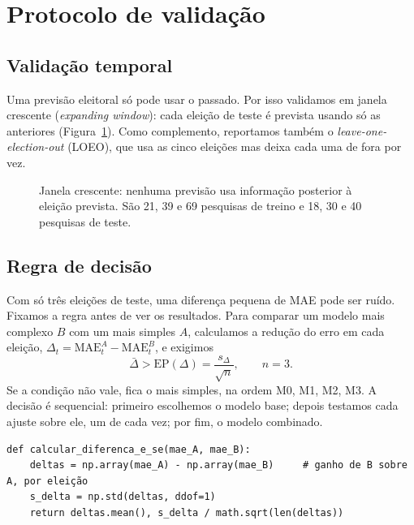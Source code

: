 \documentclass[10.5pt,a4paper]{article}
\begin{document}
\section{Protocolo de validação}

\subsection{Validação temporal}
Uma previsão eleitoral só pode usar o passado. Por isso validamos em janela crescente (\emph{expanding window}): cada eleição de teste é prevista usando só as anteriores (Figura~\ref{fig:ew}). Como complemento, reportamos também o \emph{leave-one-election-out} (LOEO), que usa as cinco eleições mas deixa cada uma de fora por vez.

\begin{figure}[h]
\centering
{}
\caption{Janela crescente: nenhuma previsão usa informação posterior à eleição prevista. São 21, 39 e 69 pesquisas de treino e 18, 30 e 40 pesquisas de teste.}
\label{fig:ew}
\end{figure}

\subsection{Regra de decisão}
Com só três eleições de teste, uma diferença pequena de MAE pode ser ruído. Fixamos a regra antes de ver os resultados. Para comparar um modelo mais complexo $B$ com um mais simples $A$, calculamos a redução do erro em cada eleição, $\Delta_t=\text{MAE}^A_t-\text{MAE}^B_t$, e exigimos
\begin{equation}
\bar\Delta>\text{EP}(\Delta)=\frac{s_\Delta}{\sqrt{n}},\qquad n=3 .
\label{eq:regra}
\end{equation}
Se a condição não vale, fica o mais simples, na ordem M0, M1, M2, M3. A decisão é sequencial: primeiro escolhemos o modelo base; depois testamos cada ajuste sobre ele, um de cada vez; por fim, o modelo combinado.
\begin{lstlisting}
def calcular_diferenca_e_se(mae_A, mae_B):
    deltas = np.array(mae_A) - np.array(mae_B)     # ganho de B sobre A, por eleição
    s_delta = np.std(deltas, ddof=1)
    return deltas.mean(), s_delta / math.sqrt(len(deltas))
\end{lstlisting}
\end{document}
